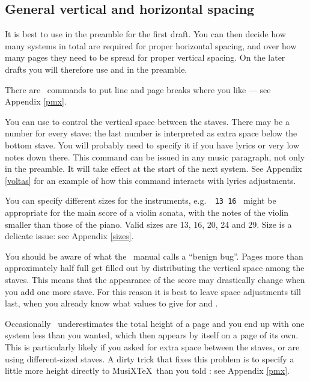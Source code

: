 \documentclass[11pt]{article}
\begin{document}
\subsection{General vertical and horizontal spacing}

It is best to use  in the preamble for the first draft.  
You can then decide how many systems in total are required for proper 
horizontal spacing, and over how many pages they need to be spread for 
proper vertical spacing.  On the later drafts you will therefore use 
 and  in the preamble. 

There are \PMX\ commands to put line and page breaks where you like --- 
see Appendix \ref{pmx}. 

You can use  to control the vertical space between the
staves.  There may be a number for every stave: the last number is
interpreted as extra space below the bottom stave.   You will probably
need to specify it if you have lyrics or very low notes down there.
This command can be issued in any music paragraph, not only in
the preamble.  It will take effect at the start of the next system.
See Appendix \ref{voltas} for an example of how this command interacts
with lyrics adjustments.

You can specify different sizes for the instruments, 
e.g.\verb" "\verb" 13 16 "  
might be appropriate for the main score
of a violin sonata, with the notes of the violin smaller than those
of the piano.  Valid sizes are 13, 16, 20, 24 and 29. 
Size is a delicate issue: see Appendix \ref{sizes}.   

You should be aware of what the \PMX\ manual calls a ``benign bug''.
Pages more than approximately half full get filled out by distributing
the vertical space among the staves.  This means that the appearance of
the score may drastically change when you add one more stave.  For this
reason it is best to leave space adjustments till last, when you already
know what values to give for  and .

Occasionally \PMX\ underestimates
the total height of a page and you end up with one system less than
you wanted, which then appears by itself on a page of its own.  This
is particularly likely if you asked for extra space between the
staves, or are using different-sized staves.  A dirty 
trick that fixes this problem is to specify a little more height
directly to MusiX\TeX\ than you told \PMX: see Appendix \ref{pmx}.
\end{document}
